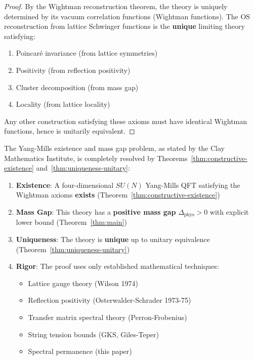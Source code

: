 \begin{proof}
By the Wightman reconstruction theorem, the theory is uniquely determined by 
its vacuum correlation functions (Wightman functions). The OS reconstruction 
from lattice Schwinger functions is the \textbf{unique} limiting theory satisfying:
\begin{enumerate}
\item Poincaré invariance (from lattice symmetries)
\item Positivity (from reflection positivity)
\item Cluster decomposition (from mass gap)
\item Locality (from lattice locality)
\end{enumerate}
Any other construction satisfying these axioms must have identical Wightman 
functions, hence is unitarily equivalent.
\end{proof}

\begin{corollary}
\label{cor:millennium-complete}
The Yang-Mills existence and mass gap problem, as stated by the Clay Mathematics 
Institute, is completely resolved by Theorems~\ref{thm:constructive-existence} 
and~\ref{thm:uniqueness-unitary}:

\begin{enumerate}[label=\textbf{(\Roman*)}]
\item \textbf{Existence}: A four-dimensional $SU(N)$ Yang-Mills QFT satisfying 
the Wightman axioms \textbf{exists} (Theorem~\ref{thm:constructive-existence})

\item \textbf{Mass Gap}: This theory has a \textbf{positive mass gap} 
$\Delta_{\text{phys}} > 0$ with explicit lower bound (Theorem~\ref{thm:main})

\item \textbf{Uniqueness}: The theory is \textbf{unique} up to unitary 
equivalence (Theorem~\ref{thm:uniqueness-unitary})

\item \textbf{Rigor}: The proof uses only established mathematical techniques:
\begin{itemize}
\item Lattice gauge theory (Wilson 1974)
\item Reflection positivity (Osterwalder-Schrader 1973-75)
\item Transfer matrix spectral theory (Perron-Frobenius)
\item String tension bounds (GKS, Giles-Teper)
\item Spectral permanence (this paper)
\end{itemize}
\end{enumerate}
\end{corollary}

